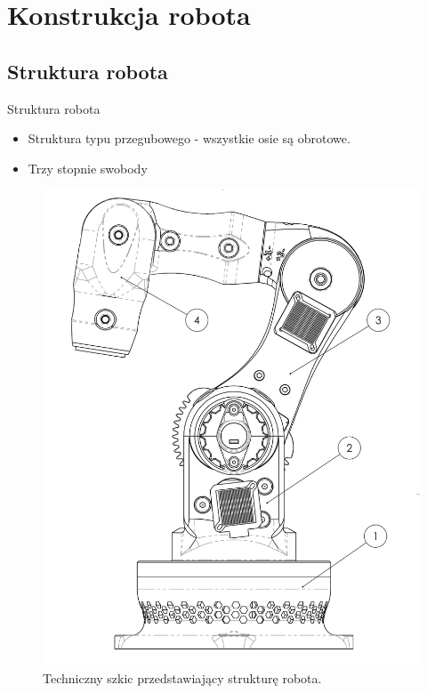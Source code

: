 \documentclass{beamer}
\begin{document}
\section{Konstrukcja robota}
\subsection{Struktura robota}
\begin{frame}{Struktura robota}
	\begin{itemize}
		\item Struktura typu przegubowego - wszystkie osie są obrotowe.
		\item Trzy stopnie swobody
	\end{itemize}
	\begin{figure}[h]
		\centering
		\includegraphics[height=0.5\textheight]{img/calosctechn.jpg}
		\caption{Techniczny szkic przedstawiający strukturę robota.}
		\label{ros:rys_techniczny}
	\end{figure}
\end{frame}
\end{document}
